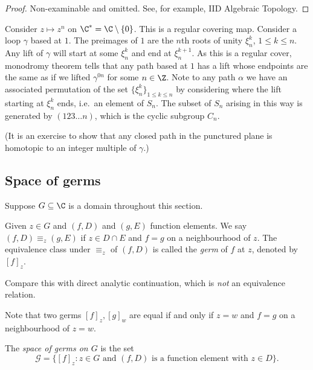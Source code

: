 \documentclass[a4paper]{article}
\begin{document}
\begin{proof}
  Non-examinable and omitted. See, for example, IID Algebraic Topology.
\end{proof}

\begin{eg}
  Consider \(z \mapsto z^n\) on \(\C^* = \C \setminus \{0\}\). This is a regular covering map. Consider a loop \(\gamma\) based at \(1\). The preimages of \(1\) are the \(n\)th roots of unity \(\xi_n^k\), \(1 \leq k \leq n\). Any lift of \(\gamma\) will start at some \(\xi_n^k\) and end at \(\xi_n^{k + 1}\). As this is a regular cover, monodromy theorem tells that any path based at \(1\) has a lift whose endpoints are the same as if we lifted \(\gamma^{0n}\) for some \(n \in \Z\). Note to any path \(\alpha\) we have an associated permutation of the set \(\{\xi_n^k\}_{1 \leq k \leq n}\) by considering where the lift starting at \(\xi_n^k\) ends, i.e.\ an element of \(S_n\). The subset of \(S_n\) arising in this way is generated by \((123\dots n)\), which is the cyclic subgroup \(C_n\).

  (It is an exercise to show that any closed path in the punctured plane is homotopic to an integer multiple of \(\gamma\).)
\end{eg}

\subsection{Space of germs}

Suppose \(G \subseteq \C\) is a domain throughout this section.

\begin{definition}[germ]
  Given \(z \in G\) and \((f, D)\) and \((g, E)\) function elements. We say \((f, D) \equiv_z (g, E)\) if \(z \in D \cap E\) and \(f = g\) on a neighbourhood of \(z\). The equivalence class under \(\equiv_z\) of \((f, D)\) is called the \emph{germ} of \(f\) at \(z\), denoted by \([f]_z\).
\end{definition}

Compare this with direct analytic continuation, which is \emph{not} an equivalence relation.

Note that two germs \([f]_z, [g]_w\) are equal if and only if \(z = w\) and \(f = g\) on a neighbourhood of \(z = w\).

\begin{definition}
  The \emph{space of germs on \(G\)} is the set
  \[
    \mathcal G = \{[f]_z: z \in G \text{ and } (f, D) \text{ is a function element with } z \in D\}.
  \]
\end{definition}
\end{document}
